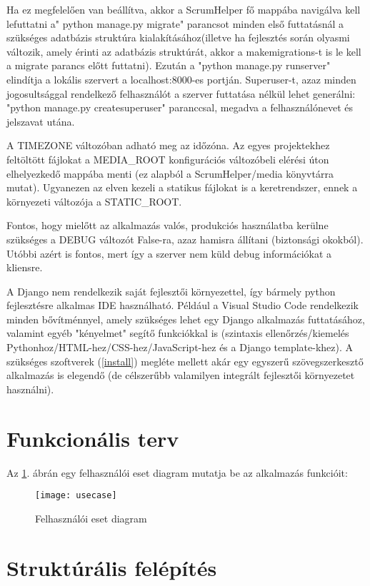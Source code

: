 Ha ez megfelelően van beállítva, akkor a ScrumHelper fő mappába navigálva kell lefuttatni a" python manage.py migrate" parancsot minden első futtatásnál a szükséges adatbázis struktúra kialakításához(illetve ha fejlesztés során olyasmi változik, amely érinti az adatbázis struktúrát, akkor a makemigrations-t is le kell a migrate parancs előtt futtatni). Ezután a "python manage.py runserver" elindítja a lokális szervert a localhost:8000-es portján. Superuser-t, azaz minden jogosultsággal rendelkező felhasználót a szerver futtatása nélkül lehet generálni: "python manage.py createsuperuser" paranccsal, megadva a felhasználónevet és jelszavat utána.

A TIMEZONE változóban adható meg az időzóna. Az egyes projektekhez feltöltött fájlokat a MEDIA\_ROOT konfigurációs változóbeli elérési úton elhelyezkedő mappába menti (ez alapból a ScrumHelper/media könyvtárra mutat). Ugyanezen az elven kezeli a statikus fájlokat is a keretrendszer, ennek a környezeti változója a STATIC\_ROOT.

Fontos, hogy mielőtt az alkalmazás valós, produkciós használatba kerülne szükséges a DEBUG változót False-ra, azaz hamisra állítani (biztonsági okokból). Utóbbi azért is fontos, mert így a szerver nem küld debug információkat a kliensre.

A Django nem rendelkezik saját fejlesztői környezettel, így bármely python fejlesztésre alkalmas IDE használható. Például a Visual Studio Code rendelkezik minden bővítménnyel, amely szükséges lehet egy Django alkalmazás futtatásához, valamint egyéb "kényelmet" segítő funkciókkal is (szintaxis ellenőrzés/kiemelés Pythonhoz/HTML-hez/CSS-hez/JavaScript-hez és a Django template-khez). A szükséges szoftverek (\ref{install}) megléte mellett akár egy egyszerű szövegszerkesztő alkalmazás is elegendő (de célszerűbb valamilyen integrált fejlesztői környezetet használni).

\section{Funkcionális terv}

Az \ref{fig:usecase}. ábrán egy felhasználói eset diagram mutatja be az alkalmazás funkcióit:

\begin{figure}[H]
	\centering
	\texttt{[image: usecase]}
	\caption{Felhasználói eset diagram}
	\label{fig:usecase}
\end{figure}

\section{Struktúrális felépítés}


